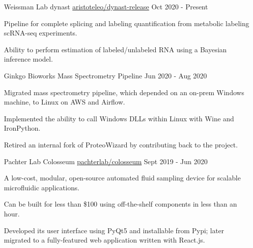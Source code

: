 

\begin{cventries}

  \cventry
    {Weissman Lab} %
    {dynast} %
    {\faGithub\phantom{a}\href{https://github.com/aristoteleo/dynast-release}{aristoteleo/dynast-release}} %
    {Oct 2020 - Present} %
    {
      \begin{cvitems} %
        \item {Pipeline for complete splicing and labeling quantification from metabolic labeling scRNA-seq experiments.}
        \item {Ability to perform estimation of labeled/unlabeled RNA using a Bayesian inference model.}
      \end{cvitems}
    }


\cventry
  {Ginkgo Bioworks} %
  {Mass Spectrometry Pipeline} %
  {} %
  {Jun 2020 - Aug 2020} %
  {
    \begin{cvitems} %
      \item {Migrated mass spectrometry pipeline, which depended on an on-prem Windows machine, to Linux on AWS and Airflow.}
      \item {Implemented the ability to call Windows DLLs within Linux with Wine and IronPython.}
      \item {Retired an internal fork of ProteoWizard by contributing back to the project.}
    \end{cvitems}
  }

\cventry
  {Pachter Lab} %
  {Colosseum} %
  {\faGithub\phantom{a}\href{https://github.com/pachterlab/colosseum}{pachterlab/colosseum}} %
  {Sept 2019 - Jun 2020} %
  {
    \begin{cvitems} %
      \item {A low-cost, modular, open-source automated fluid sampling device for scalable microfluidic applications.}
      \item {Can be built for less than \$100 using off-the-shelf components in less than an hour.}
      \item {Developed its user interface using PyQt5 and installable from Pypi; later migrated to a fully-featured web application written with React.js.}
    \end{cvitems}
  }


\end{cventries}

